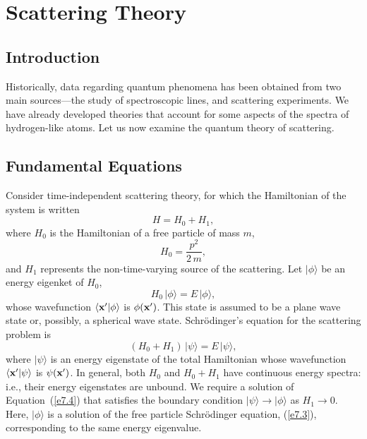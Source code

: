 \chapter{Scattering Theory}

\section{Introduction}
Historically,  data regarding quantum phenomena has been
obtained from two main sources---the study of spectroscopic lines,
and scattering experiments. 
We have already developed theories that account
for some aspects of the spectra  of hydrogen-like atoms.
Let us now examine the quantum theory of
scattering. 

\section{Fundamental Equations}
Consider time-independent scattering theory, for which the Hamiltonian
of the system is written
\begin{equation}
H= H_0 + H_1,
\end{equation}
where $H_0$ is the Hamiltonian of a free particle of mass $m$,
\begin{equation}
H_0 = \frac{p^2}{2\,m},
\end{equation}
and $H_1$ represents the non-time-varying source of the scattering. Let $|\phi\rangle$
be an energy eigenket of $H_0$,
\begin{equation}\label{e7.3}
H_0\, |\phi\rangle = E\, |\phi\rangle,
\end{equation}
whose wavefunction $\langle {\bf x}'|\phi\rangle$ is
$\phi({\bf x}')$. This state is   assumed to be a plane wave state or, possibly, a
spherical wave state. 
Schr\"{o}dinger's equation for the scattering problem is
\begin{equation}\label{e7.4}
(H_0 + H_1)\, |\psi\rangle = E\,|\psi\rangle,
\end{equation}
where $|\psi\rangle$ is an energy eigenstate of the total Hamiltonian
whose wavefunction $\langle {\bf x}'|\psi\rangle$ is $\psi({\bf x}')$. 
In general, both $H_0$ and $H_0 + H_1$ have continuous energy
spectra: {\rm i.e.}, their  energy eigenstates are unbound.
We require a solution of Equation~(\ref{e7.4}) that satisfies the
boundary condition $|\psi\rangle \rightarrow |\phi\rangle$ as
$H_1\rightarrow 0$. Here, $|\phi\rangle$ is a solution of the free particle
Schr\"{o}dinger equation, (\ref{e7.3}), corresponding to the same energy eigenvalue.

